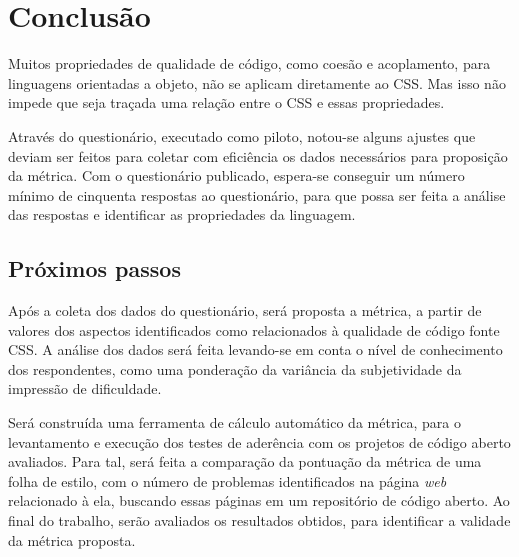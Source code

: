 %
%

\chapter{Conclusão}

Muitos propriedades de qualidade de código, como coesão e acoplamento, para linguagens orientadas a objeto, não se aplicam diretamente ao CSS. Mas isso não impede que seja traçada uma relação entre o CSS e essas propriedades.

Através do questionário, executado como piloto, notou-se alguns ajustes que deviam ser feitos para coletar com eficiência os dados necessários para proposição da métrica. Com o questionário publicado, espera-se conseguir um número mínimo de cinquenta respostas ao questionário, para que possa ser feita a análise das respostas e identificar as propriedades da linguagem.

\section{Próximos passos}

Após a coleta dos dados do questionário, será proposta a métrica, a partir de valores dos aspectos identificados como relacionados à qualidade de código fonte CSS. A análise dos dados será feita levando-se em conta o nível de conhecimento dos respondentes, como uma ponderação da variância da subjetividade da impressão de dificuldade.

Será construída uma ferramenta de cálculo automático da métrica, para o levantamento e execução dos testes de aderência com os projetos de código aberto avaliados. Para tal, será feita a comparação da pontuação da métrica de uma folha de estilo, com o número de problemas identificados na página \textit{web} relacionado à ela, buscando essas páginas em um repositório de código aberto. Ao final do trabalho, serão avaliados os resultados obtidos, para identificar a validade da métrica proposta.